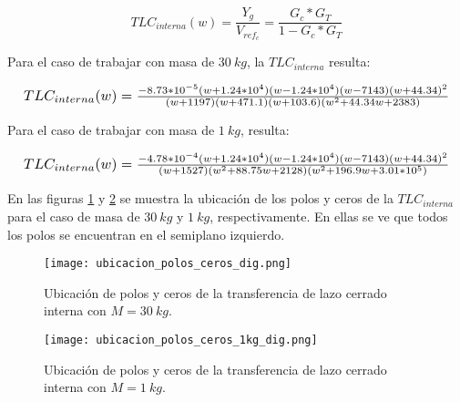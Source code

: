 \begin{equation}
	TLC_{interna}(w)=\frac{Y_g}{V_{ref_c}}=\frac{G_c*G_T}{1-G_c*G_T}
\end{equation}

Para el caso de trabajar con masa de $30\:kg$, la $TLC_{interna}$ resulta:
%

\begin{equation*}
	\resizebox{.99\hsize}{!}
	{
		$
		TLC_{interna}(w)=\frac{-8.73*10^{-5} (w+1.24*10^4) (w-1.24*10^4) (w-7143) (w+44.34)^2}{(w+1197) (w+471.1) (w+103.6) (w^2 + 44.34w + 2383)}
		$
	}
\end{equation*}


Para el caso de trabajar con masa de $1\:kg$, resulta:


\begin{equation*}
	\resizebox{.99\hsize}{!}
	{
		$
		TLC_{interna}(w)=\frac{-4.78*10^{-4} (w+1.24*10^4) (w-1.24*10^4) (w-7143) (w+44.34)^2}{(w+1527) (w^2 + 88.75w + 2128) (w^2 + 196.9w + 3.01*10^5)}	
		$
	}
\end{equation*}



En las figuras \ref{fig:ubicacion_polos_y_ceros_dig} y \ref{fig:ubicacion_polos_y_ceros_1kg_dig} se muestra la ubicación de los polos y ceros de la $TLC_{interna}$ para el caso de masa de $30\:kg$ y $1\:kg$, respectivamente. En ellas se ve que todos los polos se encuentran en el semiplano izquierdo. 

\begin{figure}[H]
	\centering
	\texttt{[image: ubicacion\_polos\_ceros\_dig.png]}
	\caption{Ubicación de polos y ceros de la transferencia de lazo cerrado interna con $M=30\:kg$.}
	\label{fig:ubicacion_polos_y_ceros_dig}
\end{figure}

\begin{figure}[H]
	\centering
	\texttt{[image: ubicacion\_polos\_ceros\_1kg\_dig.png]}
	\caption{Ubicación de polos y ceros de la transferencia de lazo cerrado interna con $M=1\:kg$.}
	\label{fig:ubicacion_polos_y_ceros_1kg_dig}
\end{figure}

